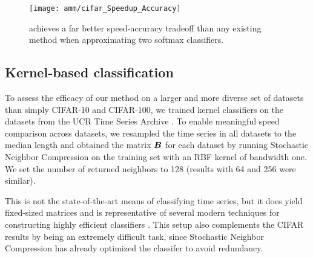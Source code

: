\begin{figure}[h]
\begin{center}
\texttt{[image: amm/cifar\_Speedup\_Accuracy]}
\caption{\oursp achieves a far better speed-accuracy tradeoff than any existing method when approximating two softmax classifiers.}
\label{fig:cifar}
\end{center}
\end{figure}

\subsection{Kernel-based classification}

To assess the efficacy of our method on a larger and more diverse set of datasets than simply CIFAR-10 and CIFAR-100, we trained kernel classifiers on the datasets from the UCR Time Series Archive \cite{UCRArchive2018}. To enable meaningful speed comparison across datasets, we resampled the time series in all datasets to the median length and obtained the matrix $\bm{B}$ for each dataset by running Stochastic Neighbor Compression \cite{snc} on the training set with an RBF kernel of bandwidth one. We set the number of returned neighbors to 128 (results with 64 and 256 were similar).

This is not the state-of-the-art means of classifying time series, but it does yield fixed-sized matrices and is representative of several modern techniques for constructing highly efficient classifiers \cite{snc,dsnc,bnc,protonn}. This setup also complements the CIFAR results by being an extremely difficult task, since Stochastic Neighbor Compression has already optimized the classifer to avoid redundancy. %

